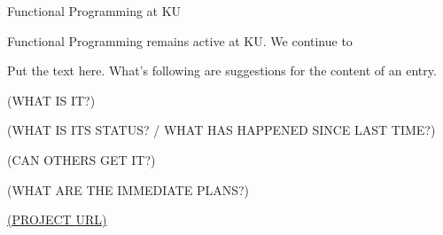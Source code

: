 \documentclass{scrreprt}
\begin{document}
\begin{hcarentry}{Functional Programming at KU}
\makeheader

Functional Programming remains active at KU. We continue to 

Put the text here. What's following are suggestions for the content of an entry.

(WHAT IS IT?)

(WHAT IS ITS STATUS? / WHAT HAS HAPPENED SINCE LAST TIME?)

(CAN OTHERS GET IT?)

(WHAT ARE THE IMMEDIATE PLANS?)

\FurtherReading
  \url{(PROJECT URL)}
\end{hcarentry}
\end{document}
